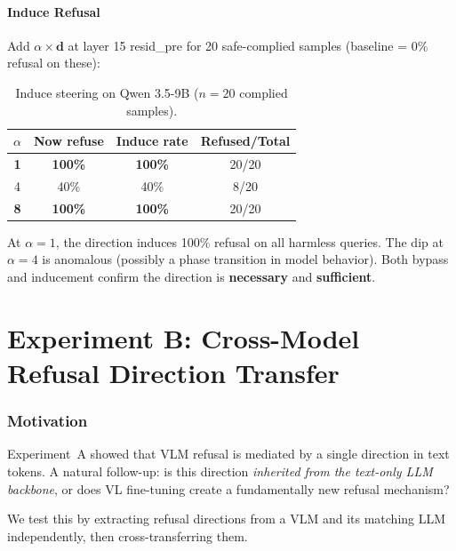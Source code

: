 \documentclass[11pt,a4paper]{article}
\begin{document}
\subsection{Induce Refusal}

Add $\alpha \times \mathbf{d}$ at layer 15 resid\_pre for 20 safe-complied samples (baseline = 0\% refusal on these):

\begin{table}[H]\centering
\caption{Induce steering on Qwen 3.5-9B ($n=20$ complied samples).}
\begin{tabular}{cccc}
\toprule
$\alpha$ & \textbf{Now refuse} & \textbf{Induce rate} & \textbf{Refused/Total} \\
\midrule
\textbf{1} & \textbf{100\%} & \textbf{100\%} & 20/20 \\
4 & 40\% & 40\% & 8/20 \\
\textbf{8} & \textbf{100\%} & \textbf{100\%} & 20/20 \\
\bottomrule
\end{tabular}
\end{table}

At $\alpha=1$, the direction induces 100\% refusal on all harmless queries. The dip at $\alpha=4$ is anomalous (possibly a phase transition in model behavior). Both bypass and inducement confirm the direction is \textbf{necessary} and \textbf{sufficient}.

\part{Experiment B: Cross-Model Refusal Direction Transfer}
\label{part:expB}

\section{Motivation}

Experiment~A showed that VLM refusal is mediated by a single direction in text tokens. A natural follow-up: is this direction \emph{inherited from the text-only LLM backbone}, or does VL fine-tuning create a fundamentally new refusal mechanism?

We test this by extracting refusal directions from a VLM and its matching LLM independently, then cross-transferring them.
\end{document}
